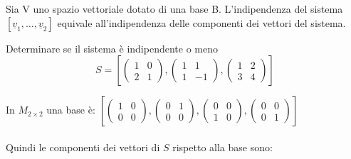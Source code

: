 	\begin{proposizione}
		\phantom{text}
		
		Sia V uno spazio vettoriale dotato di una base B. L'indipendenza del sistema $[\underline{v}_1,\dots,\underline{v}_2]$ equivale all'indipendenza delle componenti dei vettori del sistema.
		\begin{es}
			Determinare se il sistema è indipendente o meno
			\leavevmode\\
			$$S=[\begin{pmatrix}
				1 & 0\\
				2 & 1
			\end{pmatrix},\begin{pmatrix}
			1 & 1\\
			1 & -1
			\end{pmatrix},\begin{pmatrix}
			1 & 2\\
			3 & 4
			\end{pmatrix}]$$
			
			In $M_{2\times2}$ una base è: $[\begin{pmatrix}
				1 & 0\\
				0 & 0
			\end{pmatrix},\begin{pmatrix}
			0 & 1\\
			0 & 0
			\end{pmatrix},\begin{pmatrix}
			0 & 0\\
			1 & 0
			\end{pmatrix},\begin{pmatrix}
			0 & 0\\
			0 & 1
			\end{pmatrix}]$
			\leavevmode\\\\
			Quindi le componenti dei vettori di $S$ rispetto alla base sono:
		\end{es}
	\end{proposizione}
	
